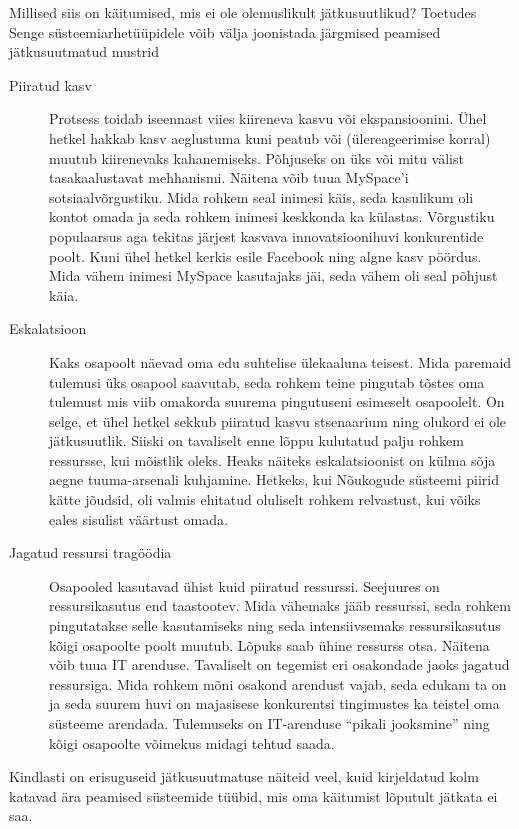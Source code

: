 \documentclass{tufte-book}
\begin{document}
Millised siis on käitumised, mis ei ole olemuslikult jätkusuutlikud? Toetudes Senge\cite{senge19905th} süsteemiarhetüüpidele võib välja joonistada järgmised peamised jätkusuutmatud mustrid
\begin{description}
	\item[Piiratud kasv] Protsess toidab iseennast viies kiireneva kasvu või ekspansioonini. Ühel hetkel hakkab kasv aeglustuma kuni peatub või (ülereageerimise korral) muutub kiirenevaks kahanemiseks. Põhjuseks on üks või mitu välist tasakaalustavat mehhanismi. Näitena võib tuua MySpace'i sotsiaalvõrgustiku. Mida rohkem seal inimesi käis, seda kasulikum oli kontot omada ja seda rohkem inimesi keskkonda ka külastas. Võrgustiku populaarsus aga tekitas järjest kasvava innovatsioonihuvi konkurentide poolt. Kuni ühel hetkel kerkis esile Facebook ning algne kasv pöördus. Mida vähem inimesi MySpace kasutajaks jäi, seda vähem oli seal põhjust käia.
	\item[Eskalatsioon] Kaks osapoolt näevad oma edu suhtelise ülekaaluna teisest. Mida paremaid tulemusi üks osapool saavutab, seda rohkem teine pingutab tõstes oma tulemust mis viib omakorda suurema pingutuseni esimeselt osapoolelt. On selge, et ühel hetkel sekkub piiratud kasvu stsenaarium ning olukord ei ole jätkusuutlik. Siiski on tavaliselt enne lõppu kulutatud palju rohkem ressursse, kui mõistlik oleks. Heaks näiteks eskalatsioonist on külma sõja aegne tuuma-arsenali kuhjamine. Hetkeks, kui Nõukogude süsteemi piirid kätte jõudsid, oli valmis ehitatud oluliselt rohkem relvastust, kui võiks eales sisulist väärtust omada.
	\item[Jagatud ressursi tragöödia] Osapooled kasutavad ühist kuid piiratud ressurssi. Seejuures on ressursikasutus end taastootev. Mida vähemaks jääb ressurssi, seda rohkem pingutatakse selle kasutamiseks ning seda intensiivsemaks ressursikasutus kõigi osapoolte poolt muutub. Lõpuks saab ühine ressurss otsa. Näitena võib tuua IT arenduse. Tavaliselt on tegemist eri osakondade jaoks jagatud ressursiga. Mida rohkem mõni osakond arendust vajab, seda edukam ta on ja seda suurem huvi on majasisese konkurentsi tingimustes ka teistel oma süsteeme arendada. Tulemuseks on IT-arenduse \enquote{pikali jooksmine} ning kõigi osapoolte võimekus midagi tehtud saada.
	
\end{description}

Kindlasti on erisuguseid jätkusuutmatuse näiteid veel, kuid kirjeldatud kolm katavad ära peamised süsteemide tüübid, mis oma käitumist lõputult jätkata ei saa.
\end{document}
